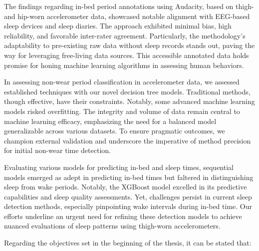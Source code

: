 \documentclass[
  10pt,
]{scrbook}
\begin{document}
The findings regarding in-bed period annotations using Audacity, based
on thigh- and hip-worn accelerometer data, showcased notable alignment
with EEG-based sleep devices and sleep diaries. The approach exhibited
minimal bias, high reliability, and favorable inter-rater agreement.
Particularly, the methodology's adaptability to pre-existing raw data
without sleep records stands out, paving the way for leveraging
free-living data sources. This accessible annotated data holds promise
for honing machine learning algorithms in assessing human behaviors.

In assessing non-wear period classification in accelerometer data, we
assessed established techniques with our novel decision tree models.
Traditional methods, though effective, have their constraints. Notably,
some advanced machine learning models risked overfitting. The integrity
and volume of data remain central to machine learning efficacy,
emphasizing the need for a balanced model generalizable across various
datasets. To ensure pragmatic outcomes, we champion external validation
and underscore the imperative of method precision for initial non-wear
time detection.

Evaluating various models for predicting in-bed and sleep times,
sequential models emerged as adept in predicting in-bed times but
faltered in distinguishing sleep from wake periods. Notably, the XGBoost
model excelled in its predictive capabilities and sleep quality
assessments. Yet, challenges persist in current sleep detection methods,
especially pinpointing wake intervals during in-bed time. Our efforts
underline an urgent need for refining these detection models to achieve
nuanced evaluations of sleep patterns using thigh-worn accelerometers.

Regarding the objectives set in the beginning of the thesis, it can be
stated that:
\end{document}
